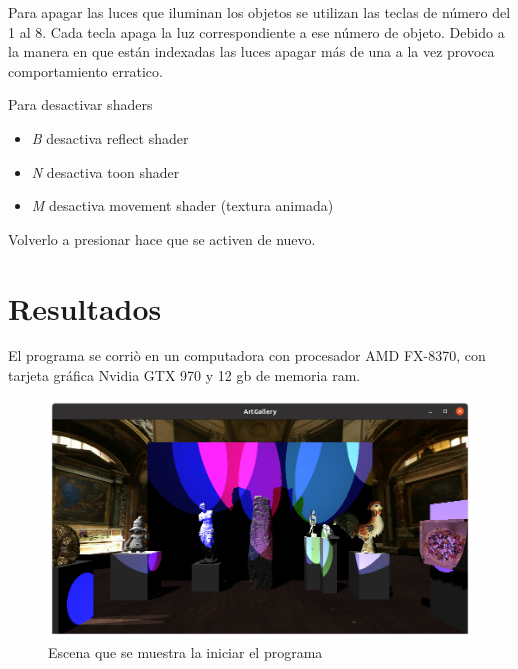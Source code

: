 \documentclass[12pt]{article}
\begin{document}
{Para apagar las luces que iluminan los objetos se utilizan las teclas de número del 1 al 8.
Cada tecla apaga la luz correspondiente a ese número de objeto. Debido a la manera en que están indexadas las luces apagar más de una a la vez provoca comportamiento erratico.

Para desactivar shaders
\begin{itemize}
\item \textit{B} desactiva reflect shader
\item \textit{N} desactiva toon shader
\item \textit{M} desactiva movement shader (textura animada)
\end{itemize}

Volverlo a presionar hace que se activen de nuevo. 

\section{Resultados}

El programa se corriò en un computadora con procesador AMD FX-8370, con tarjeta gráfica Nvidia GTX 970 y 12 gb de memoria ram. 

\begin{figure}[H]
\centering
\includegraphics[scale=0.5]{images/inicio.png}
\caption{Escena que se muestra la iniciar el programa}
\end{figure}

}
\end{document}

